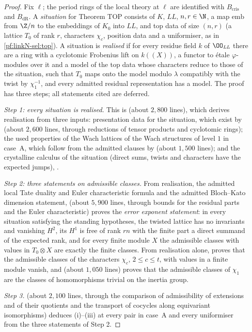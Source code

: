 \begin{proof}
Fix $\ell$; the period rings of the local theory at $\ell$ are identified with $B_{\mathrm{cris}}$ and $B_{\mathrm{dR}}$. A \emph{situation} for
Theorem TOP consists of $K$, $\mathit{LL}$, $n,r\in\N$, a map $\mathrm{emb}$ from $\Z/n$ to the embeddings of $K_0$ into $\mathit{LL}$, and top data
of size $(n,r)$ (a lattice $T_0$ of rank $r$, characters $\chi_c$, position data and a uniformiser, as in \cref{pf:linkN-sel:top}). A situation is
\emph{realised} if for every residue field $k$ of $\OO_{\mathit{LL}}$ there are a ring with a cyclotomic Frobenius lift on $k((X))$, a functor to
\'etale $\varphi$-modules over it and a model of the top data whose characters reduce to those of the situation, such that $T_0$ maps onto the
model modulo $\lambda$ compatibly with the twist by $\chi_1^{-1}$, and every admitted residual representation has a model. The proof has three
steps; all statements cited are deferred.

\emph{Step 1: every situation is realised.} This is  (about $2{,}800$ lines), which derives
realisation from three inputs: presentation data for the situation, which exist by  (about $2{,}600$ lines,
through reductions of tensor products and cyclotomic rings); the used properties of the Wach lattices of the Wach structures of level $1$ in
case~A, which follow from the admitted clauses by  (about $1{,}500$ lines); and the
crystalline calculus of the situation (direct sums, twists and characters have the expected jumps), .

\emph{Step 2: three statements on admissible classes.} From realisation, the admitted local Tate duality and Euler characteristic formula and the
admitted Bloch--Kato dimension statement,  (about $5{,}900$ lines, through bounds for the
residual parts and the Euler characteristic) proves the \emph{error exponent statement}: in every situation satisfying the standing
hypotheses, the twisted lattice has no invariants and vanishing $H^2$, its $H^1$ is free of rank $rn$ with the finite part a direct summand of the
expected rank, and for every finite module $X$ the admissible classes with values in $T_0\otimes X$ are exactly the finite classes. From realisation alone,
 proves that the admissible classes of the characters $\chi_c$, $2\le c\le t$, with values
in a finite module vanish, and  (about $1{,}050$ lines)
proves that the admissible classes of $\chi_1$ are the classes of homomorphisms trivial on the inertia group.

\emph{Step 3.}  (about $2{,}100$ lines, through the comparison of admissibility of extensions
and of their quotients and the transport of cocycles along equivariant isomorphisms) deduces (i)--(iii) at every pair in case~A and every
uniformiser from the three statements of Step 2.
\end{proof}

